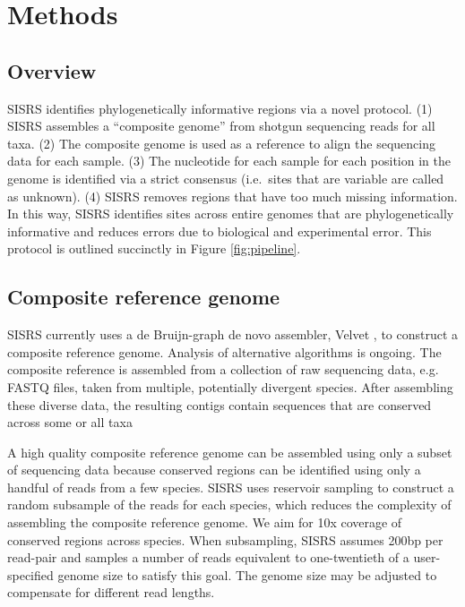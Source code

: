 \documentclass[11pt, oneside]{article}   	%
\begin{document}
\section{Methods\label{sec:Methods}}

\subsection{Overview}

SISRS identifies phylogenetically informative regions via a novel protocol. 
(1) SISRS assembles a ``composite genome'' from shotgun sequencing reads for all taxa.
(2) The composite genome is used as a reference to align the sequencing data for each sample. 
(3) The nucleotide for each sample for each position in the genome is identified via a strict consensus (i.e.\ sites that are variable are called as unknown). 
(4) SISRS removes regions that have too much missing information.
In this way, SISRS identifies sites across entire genomes that are phylogenetically informative and reduces errors due to biological and experimental error.
This protocol is outlined succinctly in Figure \ref{fig:pipeline}. 

\subsection{Composite reference genome}

SISRS currently uses a de Bruijn-graph de novo assembler, Velvet \citep{Zerbino2008}, to construct a composite reference genome.
Analysis of alternative algorithms is ongoing.
The composite reference is assembled from a collection of raw sequencing data, e.g. FASTQ files, taken from multiple, potentially divergent species.
After assembling these diverse data, the resulting contigs contain sequences that are conserved across some or all taxa

A high quality composite reference genome can be assembled using only a subset of sequencing data because conserved regions can be identified using only a handful of reads from a few species. 
SISRS uses reservoir sampling \citep{Vitter1985} to construct a random subsample of the reads for each species, which reduces the complexity of assembling the composite reference genome.
We aim for 10x coverage of conserved regions across species.
When subsampling, SISRS assumes 200bp per read-pair and samples a number of reads equivalent to one-twentieth of a user-specified genome size to satisfy this goal.
The genome size may be adjusted to compensate for different read lengths.
\end{document}
